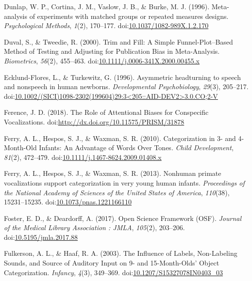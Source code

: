 \documentclass[man]{apa6}
\begin{document}
\hypertarget{ref-dunlap_meta-analysis_1996}{}
Dunlap, W. P., Cortina, J. M., Vaslow, J. B., \& Burke, M. J. (1996).
Meta-analysis of experiments with matched groups or repeated measures
designs. \emph{Psychological Methods}, \emph{1}(2), 170--177.
doi:\href{https://doi.org/10.1037/1082-989X.1.2.170}{10.1037/1082-989X.1.2.170}

\hypertarget{ref-duval_trim_2000}{}
Duval, S., \& Tweedie, R. (2000). Trim and Fill: A Simple
Funnel-Plot--Based Method of Testing and Adjusting for Publication Bias
in Meta-Analysis. \emph{Biometrics}, \emph{56}(2), 455--463.
doi:\href{https://doi.org/10.1111/j.0006-341X.2000.00455.x}{10.1111/j.0006-341X.2000.00455.x}

\hypertarget{ref-ecklund-flores_asymmetric_1996}{}
Ecklund-Flores, L., \& Turkewitz, G. (1996). Asymmetric headturning to
speech and nonspeech in human newborns. \emph{Developmental
Psychobiology}, \emph{29}(3), 205--217.
doi:\href{https://doi.org/10.1002/(SICI)1098-2302(199604)29:3\%3C205::AID-DEV2\%3E3.0.CO;2-V}{10.1002/(SICI)1098-2302(199604)29:3\textless{}205::AID-DEV2\textgreater{}3.0.CO;2-V}

\hypertarget{ref-ference_role_2018}{}
Ference, J. D. (2018). The Role of Attentional Biases for Conspecific
Vocalizations.
doi:\href{https://doi.org/http://dx.doi.org/10.11575/PRISM/31878}{http://dx.doi.org/10.11575/PRISM/31878}

\hypertarget{ref-ferry_categorization_2010}{}
Ferry, A. L., Hespos, S. J., \& Waxman, S. R. (2010). Categorization in
3- and 4-Month-Old Infants: An Advantage of Words Over Tones.
\emph{Child Development}, \emph{81}(2), 472--479.
doi:\href{https://doi.org/10.1111/j.1467-8624.2009.01408.x}{10.1111/j.1467-8624.2009.01408.x}

\hypertarget{ref-ferry_nonhuman_2013}{}
Ferry, A. L., Hespos, S. J., \& Waxman, S. R. (2013). Nonhuman primate
vocalizations support categorization in very young human infants.
\emph{Proceedings of the National Academy of Sciences of the United
States of America}, \emph{110}(38), 15231--15235.
doi:\href{https://doi.org/10.1073/pnas.1221166110}{10.1073/pnas.1221166110}

\hypertarget{ref-foster_open_2017}{}
Foster, E. D., \& Deardorff, A. (2017). Open Science Framework (OSF).
\emph{Journal of the Medical Library Association : JMLA}, \emph{105}(2),
203--206.
doi:\href{https://doi.org/10.5195/jmla.2017.88}{10.5195/jmla.2017.88}

\hypertarget{ref-fulkerson_influence_2003}{}
Fulkerson, A. L., \& Haaf, R. A. (2003). The Influence of Labels,
Non-Labeling Sounds, and Source of Auditory Input on 9- and
15-Month-Olds' Object Categorization. \emph{Infancy}, \emph{4}(3),
349--369.
doi:\href{https://doi.org/10.1207/S15327078IN0403_03}{10.1207/S15327078IN0403\_03}
\end{document}
